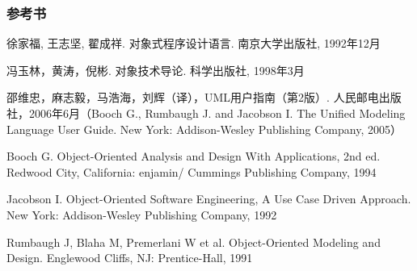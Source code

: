 \documentclass[compress]{beamer}
\begin{document}
\begin{frame}
  \frametitle{参考书}
\footnotesize
\begin{thebibliography}{}

  徐家福, 王志坚, 翟成祥. 对象式程序设计语言. 南京大学出版社, 1992年12月

  冯玉林，黄涛，倪彬. 对象技术导论. 科学出版社, 1998年3月

   邵维忠，麻志毅，马浩海，刘辉（译），UML用户指南（第2版）. 人民邮电出版社，2006年6月（Booch G., Rumbaugh J. and Jacobson I. The Unified Modeling Language User Guide. New York: Addison-Wesley Publishing Company, 2005）

 Booch G. Object-Oriented Analysis and Design With Applications, 2nd ed. Redwood City, California: enjamin/ Cummings Publishing Company, 1994

  Jacobson I. Object-Oriented Software Engineering, A Use Case Driven Approach. New York: Addison-Wesley Publishing Company, 1992

  Rumbaugh J, Blaha M, Premerlani W et al. Object-Oriented Modeling and Design. Englewood Cliffs, NJ: Prentice-Hall, 1991


\end{thebibliography}
\end{frame}
\end{document}
